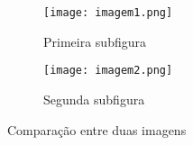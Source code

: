 

\begin{figure}[htbp]
    \centering
    \begin{subfigure}[b]{0.45\textwidth}
        \centering
        \texttt{[image: imagem1.png]}
        \caption{Primeira subfigura}
        \label{fig:sub1}
    \end{subfigure}
    \hfill
    \begin{subfigure}[b]{0.45\textwidth}
        \centering
        \texttt{[image: imagem2.png]}
        \caption{Segunda subfigura}
        \label{fig:sub2}
    \end{subfigure}
    \caption{Comparação entre duas imagens}
    \label{fig:comparacao}
\end{figure}







